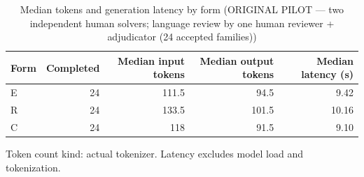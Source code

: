 \begin{table}[t]
\centering
\small
\caption{Median tokens and generation latency by form (ORIGINAL PILOT --- two independent human solvers; language review by one human reviewer + adjudicator (24 accepted families))}
\label{tab:pilotorig-Qwen3-4B-resources}
\begin{tabular}{lrrrr}
\toprule
Form & Completed & Median input tokens & Median output tokens & Median latency (s) \\
\midrule
E & 24 & 111.5 & 94.5 & 9.42 \\
R & 24 & 133.5 & 101.5 & 10.16 \\
C & 24 & 118 & 91.5 & 9.10 \\
\bottomrule
\end{tabular}
\par\smallskip
\parbox{\linewidth}{\footnotesize Token count kind: actual tokenizer. Latency excludes model load and tokenization.}
\end{table}
